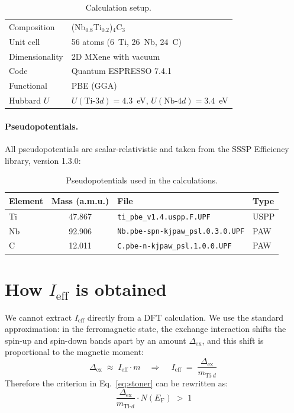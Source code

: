 \documentclass[11pt,a4paper]{article}
\newcommand{\Ef}{E_{\mathrm{F}}}
\newcommand{\Tid}{\text{Ti-}d}
\newcommand{\Dex}{\Delta_{\text{ex}}}
\newcommand{\Ieff}{I_{\text{eff}}}
\newcommand{\NEf}{N(\Ef)}
\begin{document}
\begin{table}[h!]
\centering
\begin{tabular}{l l}
\toprule
Composition           & (Nb$_{0.8}$Ti$_{0.2}$)$_4$C$_3$ \\
Unit cell             & 56 atoms (6~Ti, 26~Nb, 24~C) \\
Dimensionality        & 2D MXene with vacuum \\
Code                  & Quantum ESPRESSO 7.4.1 \\
Functional            & PBE (GGA) \\
Hubbard $U$           & $U(\text{Ti-}3d) = 4.3$~eV, $U(\text{Nb-}4d) = 3.4$~eV \\
\bottomrule
\end{tabular}
\caption{Calculation setup.}
\end{table}

\paragraph{Pseudopotentials.} All pseudopotentials are scalar-relativistic
and taken from the SSSP Efficiency library, version 1.3.0:

\begin{table}[h!]
\centering
\small
\begin{tabular}{l c l l}
\toprule
Element & Mass (a.m.u.) & File & Type \\
\midrule
Ti & 47.867 & \texttt{ti\_pbe\_v1.4.uspp.F.UPF}              & USPP \\
Nb & 92.906 & \texttt{Nb.pbe-spn-kjpaw\_psl.0.3.0.UPF}       & PAW  \\
C  & 12.011 & \texttt{C.pbe-n-kjpaw\_psl.1.0.0.UPF}          & PAW  \\
\bottomrule
\end{tabular}
\caption{Pseudopotentials used in the calculations.}
\end{table}

\section{How $\Ieff$ is obtained}

We cannot extract $\Ieff$ directly from a DFT calculation. We use the
standard approximation: in the ferromagnetic state, the exchange
interaction shifts the spin-up and spin-down bands apart by an amount
$\Dex$, and this shift is proportional to the magnetic moment:
%
\begin{equation}
    \Dex \;\approx\; \Ieff \cdot m
    \quad\Longrightarrow\quad
    \boxed{\,\Ieff \;=\; \frac{\Dex}{m_{\Tid}}\,}
    \label{eq:Ieff}
\end{equation}
%
Therefore the criterion in
Eq.~\eqref{eq:stoner} can be rewritten as:
%
\begin{equation}
    \boxed{\,\frac{\Dex}{m_{\Tid}} \cdot \NEf \;>\; 1\,}
    \label{eq:stoner-practical}
\end{equation}
\end{document}
